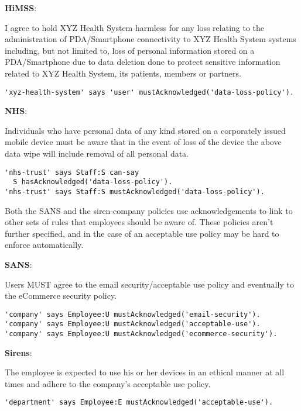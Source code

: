 \documentclass{easychair}
\newenvironment{policyrule}[1]{%
  \begin{mdframed}\footnotesize
      \noindent\textbf{\sffamily #1}:~\itshape%
}{%
  \end{mdframed}
}
\begin{document}
\begin{center}
  \noindent
    \begin{policyrule}{HiMSS}
      I agree to hold XYZ Health System harmless for any loss relating to the
      administration of PDA/Smartphone connectivity to XYZ Health System systems
      including, but not limited to, loss of personal information stored on a
      PDA/Smartphone due to data deletion done to protect sensitive information
      related to XYZ Health System, its patients, members or partners.
      \normalfont
      \begin{lstlisting}
'xyz-health-system' says 'user' mustAcknowledged('data-loss-policy').
      \end{lstlisting}
    \end{policyrule}
    \begin{policyrule}{NHS}
      Individuals who have personal data of any kind stored on a corporately
      issued mobile device must be aware that in the event of loss of the device
      the above data wipe will include removal of all personal data.
      \normalfont
      \begin{lstlisting}
'nhs-trust' says Staff:S can-say
  S hasAcknowledged('data-loss-policy').
'nhs-trust' says Staff:S mustAcknowledged('data-loss-policy').
      \end{lstlisting}
    \end{policyrule}   
\end{center}

Both the SANS and the siren-company policies use acknowledgements to link to other sets of rules that employees should be aware of.
These policies aren't further specified, and in the case of an acceptable use policy may be hard to enforce automatically.

\begin{policyrule}{SANS}
  Users MUST agree to the email security/acceptable use policy and eventually to the eCommerce security policy.
  \begin{lstlisting}
'company' says Employee:U mustAcknowledged('email-security'). 
'company' says Employee:U mustAcknowledged('acceptable-use'). 
'company' says Employee:U mustAcknowledged('ecommerce-security').
  \end{lstlisting}
\end{policyrule}
\begin{policyrule}{Sirens}
  The employee is expected to use his or her devices in an ethical manner at all times and adhere to the company's acceptable use policy.
  \begin{lstlisting}
'department' says Employee:E mustAcknowledged('acceptable-use').
  \end{lstlisting}
\end{policyrule}
\end{document}
